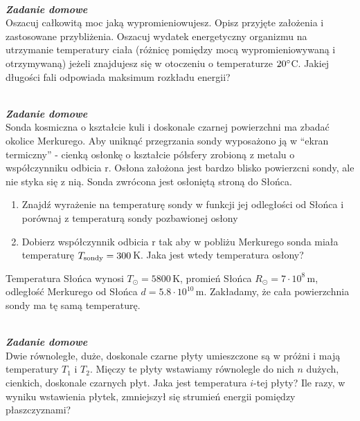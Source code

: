 \documentclass[11pt,a4paper]{article}
\newcounter{zaddom}\newcommand{\zaddom}[1][]{\addtocounter{zaddom}{1} ~\\  {\bf \emph{Zadanie domowe \arabic{zaddom} #1 }} \\}
\begin{document}
\zaddom
Oszacuj całkowitą moc jaką wypromieniowujesz. Opisz przyjęte założenia i zastosowane przybliżenia. Oszacuj
wydatek energetyczny organizmu na utrzymanie temperatury ciała (różnicę pomiędzy mocą wypromieniowywaną
i otrzymywaną) jeżeli znajdujesz się w otoczeniu o temperaturze $20\degree$C.
Jakiej długości fali odpowiada maksimum rozkładu energii?

\zaddom
Sonda kosmiczna o kształcie kuli i doskonale czarnej powierzchni ma zbadać okolice Merkurego. Aby uniknąć
przegrzania sondy wyposażono ją w “ekran termiczny” - cienką osłonkę o kształcie półsfery zrobioną z metalu
o współczynniku odbicia r. Osłona założona jest bardzo blisko powierzcni sondy, ale nie styka się z nią. Sonda
zwrócona jest osłoniętą stroną do Słońca.
\begin{enumerate}
\item Znajdź wyrażenie na temperaturę sondy w funkcji jej odległości od Słońca i porównaj z temperaturą sondy
pozbawionej osłony
\item Dobierz współczynnik odbicia r tak aby w pobliżu Merkurego sonda miała temperaturę $T_{\rm sondy}= 300$\,K. 
Jaka jest wtedy temperatura osłony?
\end{enumerate}
Temperatura Słońca wynosi $T_\odot= 5800$\,K, promień Słońca $R_\odot = 7 \cdot 10^8$\,m, 
odległość Merkurego od Słońca $d = 5.8 \cdot 10^{10}$\,m. 
Zakładamy, że cała powierzchnia sondy ma tę samą temperaturę.

\zaddom
Dwie równoległe, duże, doskonale czarne płyty umieszczone są w próżni i mają temperatury $T_1$ i $T_2$.
Mięczy te płyty wstawiamy równolegle do nich $n$ dużych, cienkich, doskonale czarnych płyt.
Jaka jest temperatura $i$-tej płyty? 
Ile razy, w wyniku wstawienia płytek, zmniejszył się strumień energii pomiędzy płaszczyznami? 
\end{document}
